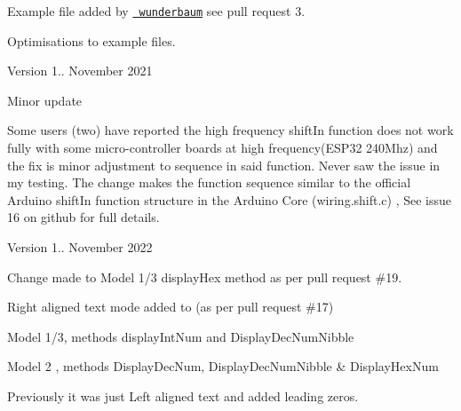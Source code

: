\begin{DoxyItemize}
\begin{DoxyItemize}
\item Example file added by \href{https://github.com/wunderbaum}{\texttt{ wunderbaum}} see pull request 3.
\item Optimisations to example files.
\end{DoxyItemize}
\item Version 1.. November 2021
\begin{DoxyItemize}
\item Minor update
\item Some users (two) have reported the high frequency shift\+In function does not work fully with some micro-\/controller boards at high frequency(\+ESP32 240\+Mhz) and the fix is minor adjustment to sequence in said function. Never saw the issue in my testing. The change makes the function sequence similar to the official Arduino shift\+In function structure in the Arduino Core (wiring.\+shift.\+c) , See issue 16 on github for full details.
\end{DoxyItemize}
\item Version 1.. November 2022
\begin{DoxyItemize}
\item Change made to Model 1/3 display\+Hex method as per pull request \#19.
\item Right aligned text mode added to (as per pull request \#17)
\begin{DoxyItemize}
\item Model 1/3, methods display\+Int\+Num and Display\+Dec\+Num\+Nibble
\item Model 2 , methods Display\+Dec\+Num, Display\+Dec\+Num\+Nibble \& Display\+Hex\+Num
\item Previously it was just Left aligned text and added leading zeros. 
\end{DoxyItemize}
\end{DoxyItemize}
\end{DoxyItemize}
